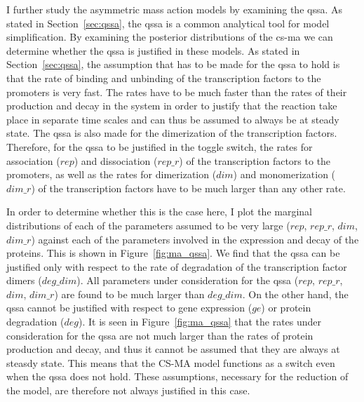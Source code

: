 
I further study the asymmetric mass action models by examining the \acrshort{qssa}. As stated in Section~\ref{sec:qssa}, the \acrshort{qssa} is a common analytical tool for model simplification. By examining the posterior distributions of the \acrshort{cs-ma} we can determine whether the \acrshort{qssa} is justified in these models. As stated in Section~\ref{sec:qssa}, the assumption that has to be made for the \acrshort{qssa} to hold is that the rate of binding and unbinding of the transcription factors to the promoters is very fast. The rates have to be much faster than the rates of their production and decay in the system in order to justify that the reaction take place in separate time scales and can thus be assumed to always be at steady state. The \acrshort{qssa} is also made for the dimerization of the transcription factors. Therefore, for the \acrshort{qssa} to be justified in the toggle switch, the rates for association ($rep$) and dissociation ($rep\_r$) of the transcription factors to the promoters, as well as the rates for dimerization ($dim$) and monomerization ($dim\_r$) of the transcription factors have to be much larger than any other rate.


In order to determine whether this is the case here, I plot the marginal distributions of each of the parameters assumed to be very large ($rep$, $rep\_r$, $dim$, $dim\_r$) against each of the parameters involved in the expression and decay of the proteins. This is shown in Figure~\ref{fig:ma_qssa}. We find that the \acrshort{qssa} can be justified only with respect to the rate of degradation of the transcription factor dimers ($deg\_dim$). All parameters under consideration for the \acrshort{qssa} ($rep$, $rep\_r$, $dim$, $dim\_r$) are found to be much larger than $deg\_dim$. On the other hand, the \acrshort{qssa} cannot be justified with respect to gene expression ($ge$) or protein degradation ($deg$). It is seen in Figure~\ref{fig:ma_qssa} that the rates under consideration for the \acrshort{qssa} are not much larger than the rates of protein production and decay, and thus it cannot be assumed that they are always at steasdy state. This means that the CS-MA model functions as a switch even when the \acrshort{qssa} does not hold. These assumptions, necessary for the reduction of the model, are therefore not always justified in this case. 

